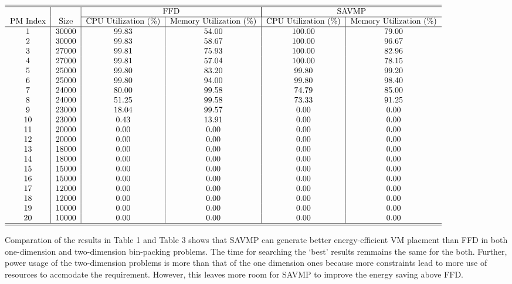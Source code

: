\documentclass[10pt, conference, compsocconf]{IEEEtran}
\begin{document}
\begin{table*}[htb!]
\caption{PM resource utilization Comparison between placement by FFD and SAVMP
on 200 VMs with capacity index = 10}
\begin{center}
$\begin{tabular}{c|c|c|c|c|c}
\hline\hline
 &  & \multicolumn{2}{c|}{FFD}&\multicolumn{2}{|c}{SAVMP} \\
 \cline{3-6}
PM Index & Size & CPU Utilization (\%) & Memory Utilization (\%) & CPU Utilization (\%)& Memory Utilization (\%)\\
\hline
1 & 30000 & 99.83 & 54.00 & 100.00 & 79.00\\
2 & 30000 & 99.83 & 58.67 & 100.00 & 96.67\\
3 & 27000 & 99.81 & 75.93 & 100.00 & 82.96\\
4 & 27000 & 99.81 & 57.04 & 100.00 & 78.15\\
5 & 25000 & 99.80 & 83.20 & 99.80 & 99.20\\
6 & 25000 & 99.80 & 94.00 & 99.80 & 98.40\\
7 & 24000 & 80.00 & 99.58 & 74.79 & 85.00\\
8 & 24000 & 51.25 & 99.58 & 73.33 & 91.25\\
9 & 23000 & 18.04 & 99.57 & 0.00 & 0.00\\
10 & 23000 & 0.43 & 13.91 & 0.00 & 0.00\\
11 & 20000 & 0.00 & 0.00 & 0.00 & 0.00\\
12 & 20000 & 0.00 & 0.00 & 0.00 & 0.00\\
13 & 18000 & 0.00 & 0.00 & 0.00 & 0.00\\
14 & 18000 & 0.00 & 0.00 & 0.00 & 0.00\\
15 & 15000 & 0.00 & 0.00 & 0.00 & 0.00\\
16 & 15000 & 0.00 & 0.00 & 0.00 & 0.00\\
17 & 12000 & 0.00 & 0.00 & 0.00 & 0.00\\
18 & 12000 & 0.00 & 0.00 & 0.00 & 0.00\\
19 & 10000 & 0.00 & 0.00 & 0.00 & 0.00\\
20 & 10000 & 0.00 & 0.00 & 0.00 & 0.00\\
\hline\hline
\end{tabular}$

\end{center}
\end{table*}

Comparation of the results in Table 1 and Table 3 shows that SAVMP can generate
better energy-efficient VM placment than FFD in both one-dimension and
two-dimension bin-packing problems. The time for searching the `best' results
remmains the same for the both. Further, power usage of
the two-dimension problems is more than that of the one dimension ones because
more constraints lead to more use of resources to accmodate the requirement.
However, this leaves more room for SAVMP to improve the energy saving above FFD. 
\end{document}
